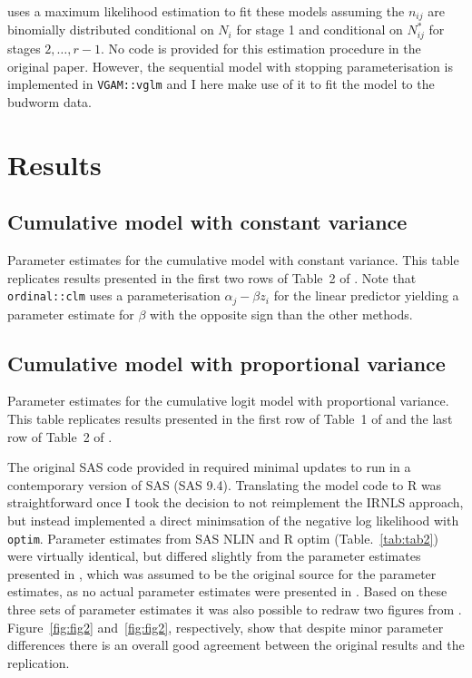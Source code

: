 \citet{candy1991modeling} uses a maximum likelihood estimation to fit these models assuming the $n_{ij}$ are binomially distributed conditional on $N_i$ for stage 1 and conditional on $N^*_{ij}$ for stages $2,\dots,r-1$. No code is provided for this estimation procedure in the original paper. However, the sequential model with stopping parameterisation is implemented in \verb+VGAM::vglm+ \citep{VGAM} and I here make use of it to fit the model to the budworm data.


\section{Results}
\subsection{Cumulative model with constant variance}

\begin{table}
  \small
    \centering
    \caption{Parameter estimates for the cumulative model with constant variance. This table replicates results presented in the first two rows of Table~2 of \citep{candy1991modeling}. Note that \texttt{ordinal::clm} uses a parameterisation $\alpha_j - \beta z_i$ for the linear predictor yielding a parameter estimate for $\beta$ with the opposite sign than the other methods.}
  
  \label{tab:tab1}
\end{table}

\subsection{Cumulative model with proportional variance}


\begin{table}
  \small
    \centering
    \caption{Parameter estimates for the cumulative logit model with proportional variance. This table replicates results presented in the first row of Table~1 of  \citep{kemp1986stochastic} and the last row of Table~2 of \citep{candy1991modeling}.}
  
  \label{tab:tab2}
\end{table}

The original SAS code provided in \citep{dennis1986stochastic} required minimal updates to run in a contemporary version of SAS (SAS 9.4). 
Translating the model code to R was straightforward once I took the decision to not reimplement the IRNLS approach, but instead implemented a direct minimsation of the negative log likelihood with \verb+optim+.  
Parameter estimates from SAS NLIN and R optim (Table.~\ref{tab:tab2}) were virtually identical, but differed slightly from the parameter estimates presented in \citep{kemp1986stochastic}, which was assumed to be the original source for the parameter estimates, as no actual parameter estimates were presented in \citep{dennis1986stochastic}. 
Based on these three sets of parameter estimates it was also possible to redraw two figures from \citep{dennis1986stochastic}. Figure~\ref{fig:fig2} and~\ref{fig:fig2}, respectively,  show that despite minor parameter differences there is an overall good agreement between the original results and the replication.
 
